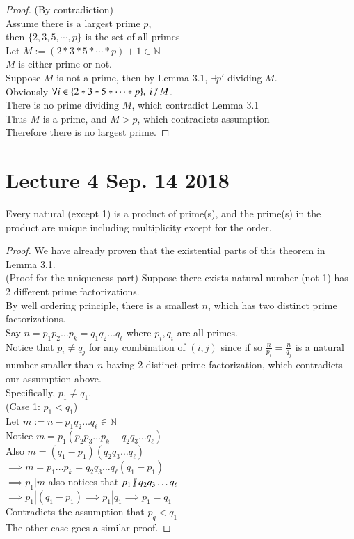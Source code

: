 \documentclass[11pt]{article}
\begin{document}
	\begin{proof}
		(By contradiction) \\
		Assume there is a largest prime $p$, \\
		then $\{2,3,5,\cdots,p\}$ is the set of all primes \\
		Let $M := (2*3*5*\cdots*p)+1 \in \mathbb{N}$ \\
		$M$ is either prime or not. \\
		Suppose $M$ is not a prime, then by Lemma 3.1, $\exists p' $ dividing $M$. \\
		Obviously $\forall i \in \{2*3*5*\cdots*p\},\ i \centernot | M$. \\
		There is no prime dividing $M$, which contradict Lemma 3.1 \\
		Thus $M$ is a prime, and $M > p$, which contradicts assumption \\
		Therefore there is no largest prime.
	\end{proof}
	
	\section{Lecture 4 Sep. 14 2018}
	\begin{theorem}
		Every natural (except 1) is a product of prime(s), and the prime(s) in the product are unique including multiplicity except for the order.
	\end{theorem}
	\begin{proof}
		We have already proven that the existential parts of this theorem in Lemma 3.1. \\
		(Proof for the uniqueness part) Suppose there exists natural number (not 1) has 2 different prime factorizations. \\
		By well ordering principle, there is a smallest $n$, which has two distinct prime factorizations. \\
		Say $n = p_1 p_2 \dots p_k = q_1 q_2 \dots q_\ell $ where $p_i, q_i$ are all primes. \\
		Notice that $p_i \neq q_j$ for any combination of $(i,j)$ since if so $\frac{n}{p_i}=\frac{n}{q_j}$ is a natural number smaller than $n$ having 2 distinct prime factorization, which contradicts our assumption above. \\
		Specifically, $p_1 \neq q_1$. \\
		(Case 1: $p_1 < q_1$) \\
		Let $m := n - p_1 q_2 \dots q_\ell \in \mathbb{N}$ \\
		Notice $m = p_1 (p_2 p_3 \dots p_k - q_2 q_3 \dots q_\ell)$ \\
		Also $m = (q_1 - p_1) (q_2 q_3 \dots q_\ell)$ \\
		$\implies m = p_1 \dots p_k = q_2 q_3 \dots q_\ell (q_1 - p_1)$ \\
		$\implies p_1 | m $ also notices that $p_1 \centernot | q_2 q_3 \dots q_\ell$ \\
		$\implies p_1 |  (q_1 - p_1) \implies p_1 | q_1 \implies p_1 = q_1$ \\
		Contradicts the assumption that $p_q < q_1$ \\
		The other case goes a similar proof.
	\end{proof}
	
\end{document}
